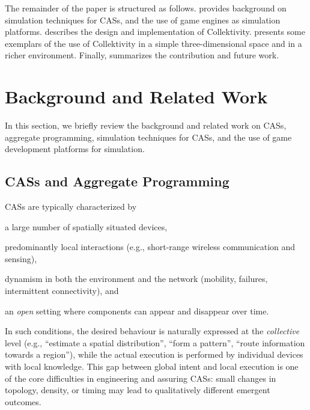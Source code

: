 The remainder of the paper is structured as follows.
 provides background on
simulation techniques for \acp{CAS}, 
and the use of game engines as simulation platforms.
 describes the design and implementation of Collektivity.
 presents some exemplars of the use of Collektivity in a simple three-dimensional space and in a richer environment.
Finally,  summarizes the contribution and future work.

\section{Background and Related Work}\label{sec:bg}

In this section,
we briefly review the background and related work on \acp{CAS}, aggregate programming,
simulation techniques for \acp{CAS}, and the use of game development platforms for simulation.

\subsection{\aclp{CAS} and Aggregate Programming}\label{sec:cas-aggregate-programming}

\aclp{CAS} are typically characterized by
\begin{inlinelist}
    \item a large number of spatially situated devices,
    \item predominantly local interactions (e.g., short-range wireless communication and sensing),
    \item dynamism in both the environment and the network (mobility, failures, intermittent connectivity),
    and
    \item an \emph{open} setting where components can appear and disappear over time.
\end{inlinelist}
%
In such conditions, the desired behaviour is naturally expressed at the \emph{collective} level
(e.g., ``estimate a spatial distribution'', ``form a pattern'', ``route information towards a region''),
while the actual execution is performed by individual devices with local knowledge.
%
This gap between global intent and local execution is one of the core difficulties in engineering and
assuring \acp{CAS}: small changes in topology, density, or timing may lead to qualitatively different
emergent outcomes.

